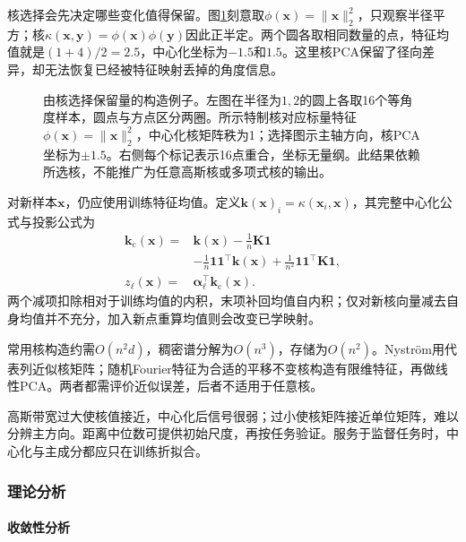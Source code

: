 核选择会先决定哪些变化值得保留。图\ref{fig:dim-kernel-radial}刻意取$\phi(\bm{x})=\lVert\bm{x}\rVert_2^2$，只观察半径平方；核$\kappa(\bm{x},\bm{y})=\phi(\bm{x})\phi(\bm{y})$因此正半定。两个圆各取相同数量的点，特征均值就是$(1+4)/2=2.5$，中心化坐标为$-1.5$和$1.5$。这里核PCA保留了径向差异，却无法恢复已经被特征映射丢掉的角度信息。

\begin{figure}[htbp]
  \centering
  
  \caption{由核选择保留量的构造例子。左图在半径为$1,2$的圆上各取16个等角度样本，圆点与方点区分两圈。所示特制核对应标量特征$\phi(\bm{x})=\lVert\bm{x}\rVert_2^2$，中心化核矩阵秩为1；选择图示主轴方向，核PCA坐标为$\pm1.5$。右侧每个标记表示16点重合，坐标无量纲。此结果依赖所选核，不能推广为任意高斯核或多项式核的输出。}
  \label{fig:dim-kernel-radial}
\end{figure}

对新样本$\bm{x}$，仍应使用训练特征均值。定义$\bm{k}(\bm{x})_i=\kappa(\bm{x}_i,\bm{x})$，其完整中心化公式与投影公式为
\begin{equation}
  \label{eq:dim-kpca-extension}
  \begin{aligned}
    \bm{k}_{\mathrm{c}}(\bm{x})
      ={}&\bm{k}(\bm{x})-\frac1n\bm{K}\bm{1}\\
         &-\frac1n\bm{1}\bm{1}^{\top}\bm{k}(\bm{x})
          +\frac1{n^2}\bm{1}\bm{1}^{\top}\bm{K}\bm{1},\\
    z_\ell(\bm{x})
      ={}&\bm{\alpha}_\ell^{\top}\bm{k}_{\mathrm{c}}(\bm{x}).
  \end{aligned}
\end{equation}
两个减项扣除相对于训练均值的内积，末项补回均值自内积；仅对新核向量减去自身均值并不充分，加入新点重算均值则会改变已学映射。

常用核构造约需$O(n^2d)$，稠密谱分解为$O(n^3)$，存储为$O(n^2)$。Nystr\"om用代表列近似核矩阵；随机Fourier特征为合适的平移不变核构造有限维特征，再做线性PCA。两者都需评价近似误差，后者不适用于任意核。

高斯带宽过大使核值接近，中心化后信号很弱；过小使核矩阵接近单位矩阵，难以分辨主方向。距离中位数可提供初始尺度，再按任务验证。服务于监督任务时，中心化与主成分都应只在训练折拟合。

\subsubsection{理论分析}
\label{sec:dim-kpca-theory}

\paragraph{收敛性分析}

